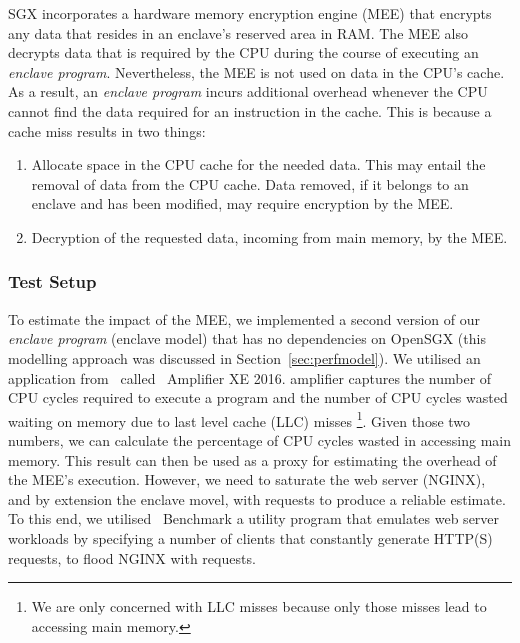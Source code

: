 \documentclass[../../../main.tex]{subfiles}
\begin{document}
\label{sec:mem-analysis}
SGX incorporates a hardware memory encryption engine (MEE) that
encrypts any data that resides in an enclave's reserved area in RAM.
The MEE also decrypts data that is required by the CPU during the
course of executing an \textit{enclave program}. Nevertheless, the MEE
is not used on data in the CPU's cache. As a result, an
\textit{enclave program} incurs additional overhead whenever the CPU
cannot find the data required for an instruction in the cache. This is
because a cache miss results in two things:
\begin{enumerate}
  \item Allocate space in the CPU cache for the needed data. This may entail
    the removal of data from the CPU cache. Data removed, if it belongs
    to an enclave and has been modified, may require encryption by the MEE.
  \item Decryption of the requested data, incoming from main memory, by the MEE.
\end{enumerate}

\subsubsection*{Test Setup}
To estimate the impact of the MEE, we implemented a second version of
our \textit{enclave program} (enclave model) that has no dependencies
on OpenSGX (this modelling approach was discussed in
Section~\ref{sec:perfmodel}). We utilised an application from
\Intel~called \VTune~Amplifier XE 2016. \VTune amplifier captures the
number of CPU cycles required to execute a program and the number of
CPU cycles wasted waiting on memory due to last level cache (LLC)
misses \footnote{We are only concerned with LLC misses because only
  those misses lead to accessing main memory.}. Given those two
numbers, we can calculate the percentage of CPU cycles wasted in
accessing main memory. This result can then be used as a proxy for
estimating the overhead of the MEE's execution. However, we need to
saturate the web server (NGINX), and by extension the enclave movel,
with requests to produce a reliable estimate. To this end, we utilised
\Apache~Benchmark a utility program that emulates web server workloads
by specifying a number of clients that constantly generate HTTP(S)
requests, to flood NGINX with requests.
\end{document}
